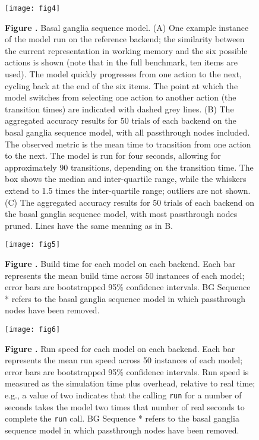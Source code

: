 \documentclass{frontiersSCNS}
\begin{document}
\begin{figure}[!ht]
\begin{center}
  \texttt{[image: fig4]}
\end{center}
\textbf{\label{fig:04} Figure .}
       {Basal ganglia sequence model. (A) One example instance
         of the model run on the reference backend; the similarity between
         the current representation in working memory and the six possible
         actions is shown (note that in the full benchmark, ten items are
         used). The model quickly progresses from one action to the next,
         cycling back at the end of the six items. The point at which the
         model switches from selecting one action to another action
         (the transition times) are indicated with dashed grey lines.
         (B) The aggregated accuracy results for 50 trials of
         each backend on the
         basal ganglia sequence model, with all passthrough nodes included.
         The observed metric is the mean
         time to transition from one action to the next. The model is run
         for four seconds, allowing for approximately 90 transitions, depending
         on the transition time. The box shows the median and
         inter-quartile range, while the whiskers extend to 1.5 times the
         inter-quartile range; outliers are not shown.
         (C) The aggregated accuracy results for 50 trials of
         each backend on the
         basal ganglia sequence model, with most passthrough nodes pruned.
         Lines have the same meaning as in B.}
\end{figure}

\begin{figure}[!ht]
\begin{center}
  \texttt{[image: fig5]}
\end{center}
\textbf{\label{fig:05} Figure .}
       {Build time for each model on each backend. Each bar represents
         the mean build time across 50 instances of each model;
         error bars are bootstrapped 95\% confidence intervals.
         BG Sequence * refers to the basal ganglia sequence model
         in which passthrough nodes have been removed.}
\end{figure}

\begin{figure}[!ht]
\begin{center}
  \texttt{[image: fig6]}
\end{center}
\textbf{\label{fig:06} Figure .}
       {Run speed for each model on each backend. Each bar represents
         the mean run speed across 50 instances of each model;
         error bars are bootstrapped 95\% confidence intervals.
         Run speed is measured as the simulation time plus overhead,
         relative to real time; e.g., a value of two indicates that
         the calling \texttt{run} for a number of seconds takes
         the model two times that number of real seconds to complete the
         \texttt{run} call.
         BG Sequence * refers to the basal ganglia sequence model
         in which passthrough nodes have been removed.}

\end{figure}
\end{document}
